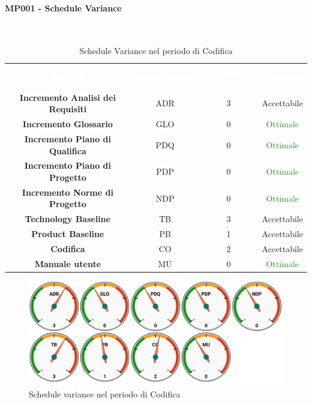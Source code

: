 \paragraph{MP001 - Schedule Variance}\mbox{}\\[0,3cm]

    \begin{table}[H]
        \centering
        \begin{tabular}{cccc}
            \rowcolor{greySWEight}
            \textcolor{white}{\textbf{Attività}} & 
            \textcolor{white}{\textbf{Abbreviazione}} &
            \textcolor{white}{\textbf{Valore Indice}}&
            \textcolor{white}{\textbf{Riscontro}}\\
            \textbf{Incremento Analisi dei Requisiti} & ADR & 3 & \textcolor{YellowOrange}{Accettabile}\\
            \textbf{Incremento Glossario} & GLO & 0 & \textcolor{ForestGreen}{Ottimale} \\
            \textbf{Incremento Piano di Qualifica} & PDQ & 0 & \textcolor{ForestGreen}{Ottimale} \\
            \textbf{Incremento Piano di Progetto} & PDP & 0 & \textcolor{ForestGreen}{Ottimale} \\
            \textbf{Incremento Norme di Progetto} & NDP & 0 & \textcolor{ForestGreen}{Ottimale} \\
            \textbf{Technology Baseline} & TB & 3 & \textcolor{YellowOrange}{Accettabile} \\
            \textbf{Product Baseline} & PB & 1 & \textcolor{YellowOrange}{Accettabile} \\
            \textbf{Codifica} & CO & 2 & \textcolor{YellowOrange}{Accettabile} \\
            \textbf{Manuale utente} & MU & 0 & \textcolor{ForestGreen}{Ottimale} \\

        \end{tabular}
        \caption{Schedule Variance nel periodo di Codifica}
    \end{table}
    \begin{figure}[H]
        \centering
        \includegraphics[width=0.9\linewidth]{sez/App_Esito/Qualifica/graph/SV_RQ.pdf}
        \caption{Schedule variance nel periodo di Codifica}
    \end{figure}
